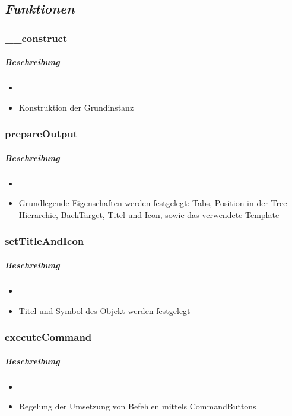 \subsection*{\textit{Funktionen}}

\subsubsection*{\_\_construct}\label{constructGDGUI}
\subparagraph{Beschreibung}
\begin{itemize}
	\item[] \noindent{}
	\item[] Konstruktion der Grundinstanz
\end{itemize}

\subsubsection*{prepareOutput}\label{prepareOutputGDGUI}
\subparagraph{Beschreibung}
\begin{itemize}
	\item[] \noindent{}
	\item[] Grundlegende Eigenschaften werden festgelegt: Tabs, Position in der Tree Hierarchie, BackTarget, Titel und Icon, sowie das verwendete Template
\end{itemize}

\subsubsection*{setTitleAndIcon}\label{setTitleAndIconGDGUI}
\subparagraph{Beschreibung}
\begin{itemize}
	\item[] \noindent{}
	\item[] Titel und Symbol des Objekt werden festgelegt
\end{itemize}

\subsubsection*{executeCommand}\label{executeCommandGDGUI}
\subparagraph{Beschreibung}
\begin{itemize}
	\item[] \noindent{}
	\item[] Regelung der Umsetzung von Befehlen mittels CommandButtons
\end{itemize}

